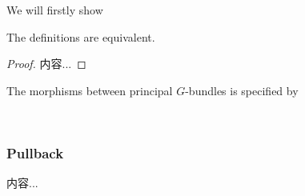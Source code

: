 \documentclass[Total.tex]{subfiles}
\begin{document}
				We will firstly show
				\begin{proposition}
					The definitions are equivalent.
				\end{proposition}
				\begin{proof}
					内容...
				\end{proof}
				
				\begin{Def}
					The morphisms between principal $G$-bundles is specified by
					\begin{center}
						\\
					\end{center}
					
				\end{Def}
				
				\subsubsection{Pullback}
				
				\begin{proposition}
					内容...
				\end{proposition}
				
\end{document}
